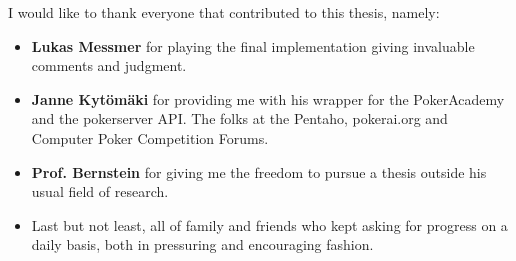 \begin{acknowledgements}

I would like to thank everyone that contributed to this thesis, namely:

\begin{itemize}
\item \textbf{Lukas Messmer} for playing the final implementation giving invaluable comments and judgment. 
\item \textbf{Janne Kyt\"om\"aki} for providing me with his wrapper for the PokerAcademy and the pokerserver API. The folks at the Pentaho, pokerai.org and Computer Poker Competition Forums.
\item \textbf{Prof. Bernstein} for giving me the freedom to pursue a thesis outside his usual field of research.
\item Last but not least, all of family and friends who kept asking for progress on a daily basis, both in pressuring and encouraging fashion.

 
\end{itemize}\end{acknowledgements}
